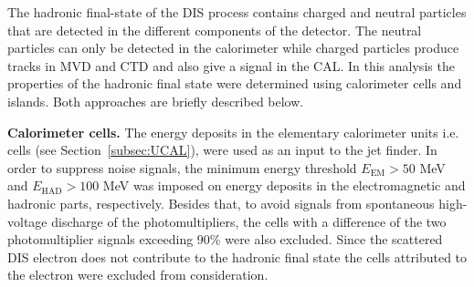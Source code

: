 The hadronic final-state of the DIS process contains charged and neutral particles that are detected in the different components of the \zeus detector. The neutral particles can only be detected in the calorimeter while charged particles produce tracks in MVD and CTD and also give a signal in the CAL. In this analysis the properties of the hadronic final state were determined using calorimeter cells and islands. Both approaches are briefly described below.

\textbf{Calorimeter cells.}
The energy deposits in the elementary calorimeter units i.e. cells (see Section~\ref{subsec:UCAL}), were used as an input to the jet finder. In order to suppress noise signals, the minimum energy threshold $E_\text{EM}>50$ MeV and $E_\text{HAD}>100$ MeV was imposed on energy deposits in the electromagnetic and hadronic parts, respectively. Besides that, to avoid signals from spontaneous high-voltage discharge of the photomultipliers, the cells with a difference of the two photomultiplier signals exceeding 90\% were also excluded. Since the scattered DIS electron does not contribute to the hadronic final state the cells attributed to the electron were excluded from consideration. 

